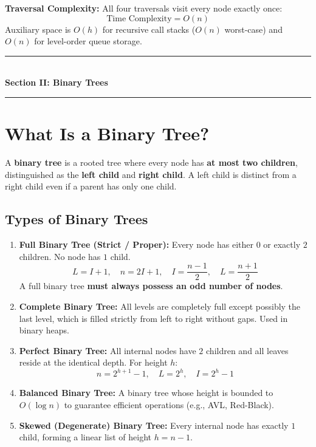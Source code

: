 \textbf{Traversal Complexity:} All four traversals visit every node exactly once:
\[
\text{Time Complexity} = O(n)
\]
Auxiliary space is $O(h)$ for recursive call stacks ($O(n)$ worst-case) and $O(n)$ for level-order queue storage.

\begin{center}
\vspace{1em}
{\color{primary}\rule{0.45\textwidth}{1.2pt}}\\[4pt]
{\Large\bfseries\color{primary} Section II: Binary Trees}\\[2pt]
{\color{primary}\rule{0.45\textwidth}{1.2pt}}
\vspace{0.5em}
\end{center}

\section{What Is a Binary Tree?}

A \textbf{binary tree} is a rooted tree where every node has \textbf{at most two children}, distinguished as the \textbf{left child} and \textbf{right child}. A left child is distinct from a right child even if a parent has only one child.

\subsection{Types of Binary Trees}

\begin{enumerate}
    \item \textbf{Full Binary Tree (Strict / Proper):} Every node has either $0$ or exactly $2$ children. No node has $1$ child.
    \[
    L = I + 1, \quad n = 2I + 1, \quad I = \frac{n - 1}{2}, \quad L = \frac{n + 1}{2}
    \]
    A full binary tree \textbf{must always possess an odd number of nodes}.
    \item \textbf{Complete Binary Tree:} All levels are completely full except possibly the last level, which is filled strictly from left to right without gaps. Used in binary heaps.
    \item \textbf{Perfect Binary Tree:} All internal nodes have $2$ children and all leaves reside at the identical depth. For height $h$:
    \[
    n = 2^{h+1} - 1, \quad L = 2^h, \quad I = 2^h - 1
    \]
    \item \textbf{Balanced Binary Tree:} A binary tree whose height is bounded to $O(\log n)$ to guarantee efficient operations (e.g., AVL, Red-Black).
    \item \textbf{Skewed (Degenerate) Binary Tree:} Every internal node has exactly $1$ child, forming a linear list of height $h = n - 1$.
\end{enumerate}

